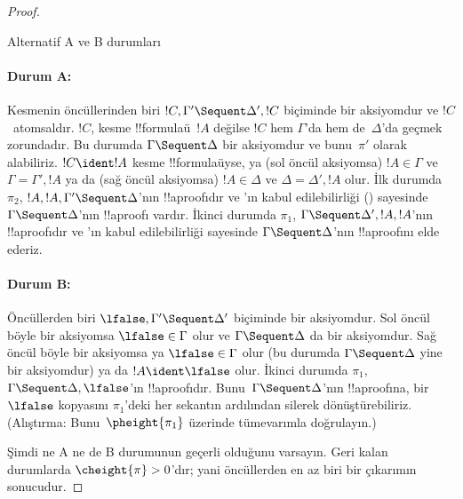 \begin{proof}
\begin{center}
Alternatif A ve B durumları
\end{center}

\paragraph{Durum A:} Kesmenin öncüllerinden biri
$!C, \Gamma' \Sequent \Delta', !C$ biçiminde bir aksiyomdur ve
$!C$~atomsaldır.
$!C$, kesme !!{formula}{}ü~$!A$ değilse $!C$ hem $\Gamma$'da hem
de~$\Delta$'da geçmek zorundadır. Bu durumda
$\Gamma \Sequent \Delta$ bir aksiyomdur ve bunu~$\pi'$ olarak
alabiliriz. $!C \ident !A$ kesme !!{formula}{}üyse, ya (sol öncül
aksiyomsa) $!A \in \Gamma$ ve $\Gamma = \Gamma', !A$ ya da (sağ
öncül aksiyomsa) $!A \in \Delta$ ve $\Delta = \Delta', !A$ olur.
İlk durumda $\pi_2$, $!A, !A, \Gamma' \Sequent \Delta$'nın
!!a{proof}{}ıdır ve \LeftR{\Contraction}'ın kabul edilebilirliği
() sayesinde
$\Gamma \Sequent \Delta$'nın !!a{proof}{}ı vardır. İkinci durumda
$\pi_1$, $\Gamma \Sequent \Delta', !A, !A$'nın !!a{proof}{}ıdır ve
\RightR{\Contraction}'ın kabul edilebilirliği sayesinde
$\Gamma \Sequent \Delta$'nın !!a{proof}{}ını elde ederiz.

\paragraph{Durum B:} Öncüllerden biri
$\lfalse, \Gamma' \Sequent \Delta'$ biçiminde bir aksiyomdur.
Sol öncül böyle bir aksiyomsa $\lfalse \in \Gamma$ olur ve
$\Gamma \Sequent \Delta$ da bir aksiyomdur. Sağ öncül böyle bir
aksiyomsa ya $\lfalse \in \Gamma$ olur (bu durumda
$\Gamma \Sequent \Delta$ yine bir aksiyomdur) ya da
$!A \ident \lfalse$ olur. İkinci durumda $\pi_1$,
$\Gamma \Sequent \Delta, \lfalse$'ın !!a{proof}{}ıdır.
Bunu~$\Gamma \Sequent \Delta$'nın !!a{proof}{}ına, bir $\lfalse$
kopyasını $\pi_1$'deki her sekantın ardılından silerek dönüştürebiliriz.
(Alıştırma: Bunu~$\pheight{\pi_1}$ üzerinde tümevarımla doğrulayın.)

Şimdi ne A ne de B durumunun geçerli olduğunu varsayın. Geri kalan
durumlarda $\cheight{\pi} > 0$'dır; yani öncüllerden en az biri bir
çıkarımın sonucudur.


\end{proof}
